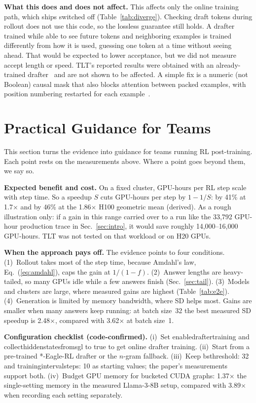 \documentclass[conference]{IEEEtran}
\newcommand{\brkus}{\textunderscore\allowbreak}
\newcommand{\code}[1]{{\small\ttfamily\let\_\brkus\hyphenchar\font=-1 #1}}
\newcommand{\x}{\ensuremath{\times}}
\begin{document}
\textbf{What this does and does not affect.} This affects only the online training path, which ships switched off (Table~\ref{tab:diverge}). Checking draft tokens during rollout does not use this code, so the lossless guarantee still holds. A drafter trained while able to see future tokens and neighboring examples is trained differently from how it is used, guessing one token at a time without seeing ahead. That would be expected to lower acceptance, but we did not measure accept length or speed. TLT's reported results were obtained with an already-trained drafter~\cite[Sec.~6.1]{hu2026tlt} and are not shown to be affected. A simple fix is a numeric (not Boolean) causal mask that also blocks attention between packed examples, with position numbering restarted for each example~\cite{krell2021packing}.

\section{Practical Guidance for Teams}
\label{sec:practice}

This section turns the evidence into guidance for teams running RL post-training. Each point rests on the measurements above. Where a point goes beyond them, we say so.

\textbf{Expected benefit and cost.} On a fixed cluster, GPU-hours per RL step scale with step time. So a speedup $S$ cuts GPU-hours per step by $1-1/S$: by 41\% at 1.7\x{} and by 46\% at the 1.86\x{} H100 geometric mean (derived). As a rough illustration only: if a gain in this range carried over to a run like the 33,792 GPU-hour production trace in Sec.~\ref{sec:intro}, it would save roughly 14,000--16,000 GPU-hours. TLT was not tested on that workload or on H20 GPUs.

\textbf{When the approach pays off.} The evidence points to four conditions. (1)~Rollout takes most of the step time, because Amdahl's law, Eq.~(\ref{eq:amdahl}), caps the gain at $1/(1-f)$. (2)~Answer lengths are heavy-tailed, so many GPUs idle while a few answers finish (Sec.~\ref{sec:tail}). (3)~Models and clusters are large, where measured gains are highest (Table~\ref{tab:e2e}). (4)~Generation is limited by memory bandwidth, where SD helps most. Gains are smaller when many answers keep running: at batch size~32 the best measured SD speedup is 2.48\x, compared with 3.62\x{} at batch size~1.

\textbf{Configuration checklist (code-confirmed).} (i)~Set \code{enable\_drafter\_training} and \code{collect\_hidden\_states\_from\_sgl} to \code{true} to get online drafter training. (ii)~Start from a pre-trained \code{*-Eagle-RL} drafter or the $n$-gram fallback. (iii)~Keep \code{bs\_threshold: 32} and \code{training\_interval\_steps: 10} as starting values; the paper's measurements support both. (iv)~Budget GPU memory for bucketed CUDA graphs: 1.37\x{} the single-setting memory in the measured Llama-3-8B setup, compared with 3.89\x{} when recording each setting separately.
\end{document}
